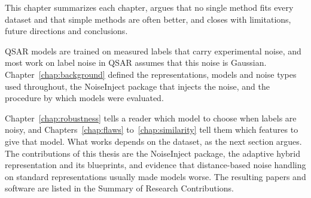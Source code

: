 
This chapter summarizes each chapter, argues that no single method fits every dataset and that simple methods are often better, and closes with limitations, future directions and conclusions. %

QSAR models are trained on measured labels that carry experimental noise, and most work on label noise in QSAR assumes that this noise is Gaussian. Chapter~\ref{chap:background} defined the representations, models and noise types used throughout, the NoiseInject package that injects the noise, and the procedure by which models were evaluated.

Chapter~\ref{chap:robustness} tells a reader which model to choose when labels are noisy, and Chapters~\ref{chap:flaws} to~\ref{chap:similarity} tell them which features to give that model. What works depends on the dataset, as the next section argues. The contributions of this thesis are the NoiseInject package, the adaptive hybrid representation and its blueprints, and evidence that distance-based noise handling on standard representations usually made models worse. The resulting papers and software are listed in the Summary of Research Contributions.
